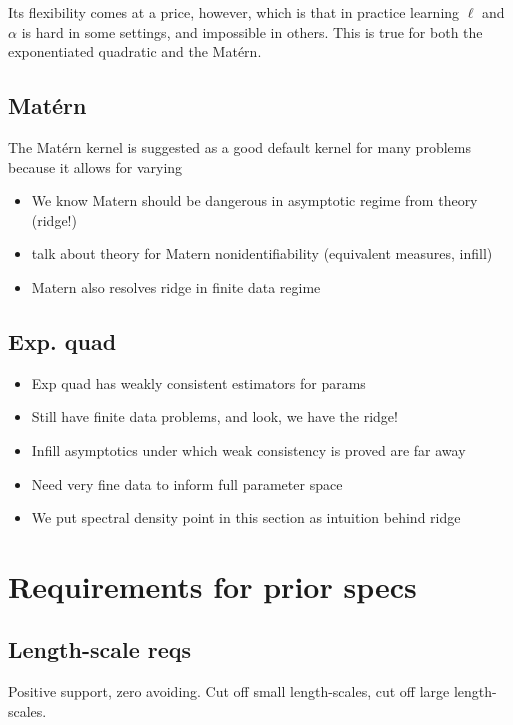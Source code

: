 \documentclass{article}
\begin{document}
Its flexibility comes at a price, however, which is that in
practice learning $\ell$ and $\alpha$ is hard in some settings, and impossible
in others. This is true for both the exponentiated quadratic and the
Mat\'{e}rn. 

  \subsection{Mat\'{e}rn}

The Mat\'{e}rn kernel is suggested as a good default kernel for many problems
because it allows for varying 

\begin{itemize}
  \item We know Matern should be dangerous in asymptotic regime from theory (ridge!)
  \item talk about theory for Matern nonidentifiability (equivalent measures, infill)
  \item Matern also resolves ridge in finite data regime
\end{itemize}

\subsection{Exp. quad}

\begin{itemize}
  \item Exp quad has weakly consistent estimators for params
  \item Still have finite data problems, and look, we have the ridge!
  \item Infill asymptotics under which weak consistency is proved are far away
  \item Need very fine data to inform full parameter space
  \item We put spectral density point in this section as intuition behind ridge
\end{itemize}

\section{Requirements for prior specs}

\subsection{Length-scale reqs}

Positive support, zero avoiding. Cut off small length-scales, cut off large
length-scales.
\end{document}

